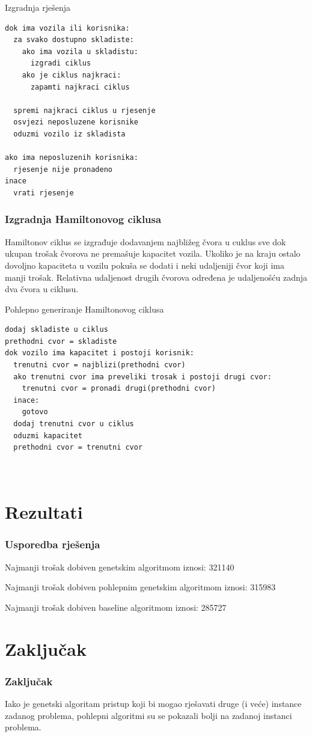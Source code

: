 \documentclass[utf8]{beamer}
\begin{document}
\begin{frame}[fragile]{Izgradnja rješenja}
\begin{lstlisting}
dok ima vozila ili korisnika:
  za svako dostupno skladiste:
    ako ima vozila u skladistu:
      izgradi ciklus
    ako je ciklus najkraci:
      zapamti najkraci ciklus

  spremi najkraci ciklus u rjesenje
  osvjezi neposluzene korisnike
  oduzmi vozilo iz skladista

ako ima neposluzenih korisnika:
  rjesenje nije pronadeno
inace
  vrati rjesenje

\end{lstlisting}
\end{frame}

\begin{frame}
\frametitle{Izgradnja Hamiltonovog ciklusa}
Hamiltonov ciklus se izgrađuje dodavanjem najbližeg čvora u cuklus sve dok ukupan trošak čvorova ne premašuje kapacitet vozila. Ukoliko je na kraju ostalo dovoljno kapaciteta u vozilu pokuša se dodati i neki udaljeniji čvor koji ima manji trošak. Relativna udaljenost drugih čvorova određena je udaljenošću zadnja dva čvora u ciklusu.
\end{frame}

\begin{frame}[fragile]{Pohlepno generiranje Hamiltonovog ciklusa}
\begin{lstlisting}
dodaj skladiste u ciklus
prethodni cvor = skladiste
dok vozilo ima kapacitet i postoji korisnik:
  trenutni cvor = najblizi(prethodni cvor)  
  ako trenutni cvor ima preveliki trosak i postoji drugi cvor:
    trenutni cvor = pronadi drugi(prethodni cvor)
  inace:
    gotovo
  dodaj trenutni cvor u ciklus
  oduzmi kapacitet
  prethodni cvor = trenutni cvor
  
  
\end{lstlisting}
\end{frame}

\section{Rezultati}
\begin{frame}
\frametitle{Usporedba rješenja}

Najmanji trošak dobiven genetskim algoritmom iznosi: 321140

\vspace{5mm}

Najmanji trošak dobiven pohlepnim genetskim algoritmom iznosi: 315983

\vspace{5mm}

Najmanji trošak dobiven baseline algoritmom iznosi: 285727

\end{frame}

\section{Zaključak}
\begin{frame}
\frametitle{Zaključak}
Iako je genetski algoritam pristup koji bi mogao rješavati druge (i veće) instance zadanog problema, pohlepni algoritmi su se pokazali bolji na zadanoj instanci problema.


\end{frame}
\end{document}
